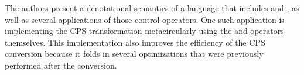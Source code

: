 \documentclass[letterpaper]{llncs}
\begin{document}
The authors present a denotational semantics of a language that includes \shiftfn and \resetfn, as well as several applications of those control operators. One such application is implementing the CPS transformation metacircularly using the \shiftfn and \resetfn operators themselves. This implementation also improves the efficiency of the CPS conversion because it folds in several optimizations that were previously performed after the conversion.








\end{document}
